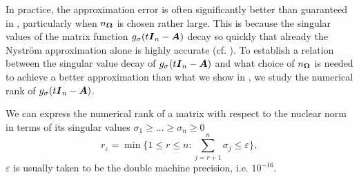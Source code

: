 \documentclass[12pt]{article}
\begin{document}
In practice, the approximation error is often significantly better than guaranteed in , particularly when $n_{\boldsymbol{\Omega}}$ is chosen rather large. This is because the singular values of the matrix function $g_{\sigma}(t\boldsymbol{I}_n - \boldsymbol{A})$ decay so quickly that already the Nyström approximation alone is highly accurate (cf. ). To establish a relation between the singular value decay of $g_{\sigma}(t\boldsymbol{I}_n - \boldsymbol{A})$ and what choice of $n_{\boldsymbol{\Omega}}$ is needed to achieve a better approximation than what we show in , we study the numerical rank of $g_{\sigma}(t\boldsymbol{I}_n - \boldsymbol{A})$.

We can express the numerical rank of a matrix with respect to the nuclear norm in terms of its singular values $\sigma_1 \geq \dots \geq \sigma_n \geq 0$
\begin{equation}
    r_{\varepsilon} = \min \{1 \leq r \leq n: \sum_{j=r+1}^n \sigma_{j} \leq \varepsilon \},
    \label{equ:numerical-rank}
\end{equation}
$\varepsilon$ is usually taken to be the double machine precision, i.e. $10^{-16}$. 

%
\end{document}
